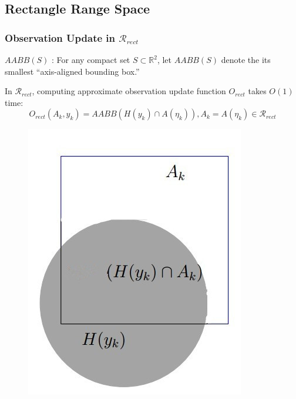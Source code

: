 \documentclass[compress]{beamer}
\begin{document}
\subsection[Rectangle Range Space]{Rectangle Range Space}
\begin{frame} \frametitle{Observation Update in $\mathcal{R}_{rect}$}
\begin{definition}{\textbf{$AABB(S)$} :}
    For any compact set $S \subset \mathbb{R}^2$, let $AABB(S)$
	denote the its smallest	``axis-aligned bounding box.''
\end{definition}

In $\mathcal{R}_{rect}$, computing approximate observation update function $O_{rect}$ takes $O(1)$ time:\\
$$ O_{rect}(A_k, y_k) = AABB(H(y_k) \cap A(\eta_k)), A_k = A(\eta_k) \in \mathcal{R}_{rect}$$

\begin{figure}
    \includegraphics[scale=0.27]{circlerect_1.jpg}
    \end{figure}
\transboxout
\end{frame}
\end{document}
